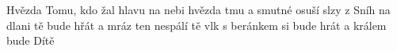 \begin{TEXT}{Hvězda}
\SLOKA {}Tomu, kdo  žal hlavu  \NL
{} na nebi hvězda  \NL
{} tmu a smutné  \NL
{} osuší slzy z  
\SLOKA Sníh na dlani tě bude hřát \NL
a mráz ten nespálí tě \NL
vlk s beránkem si bude hrát \NL
a králem bude Dítě \NL
\end{TEXT}

